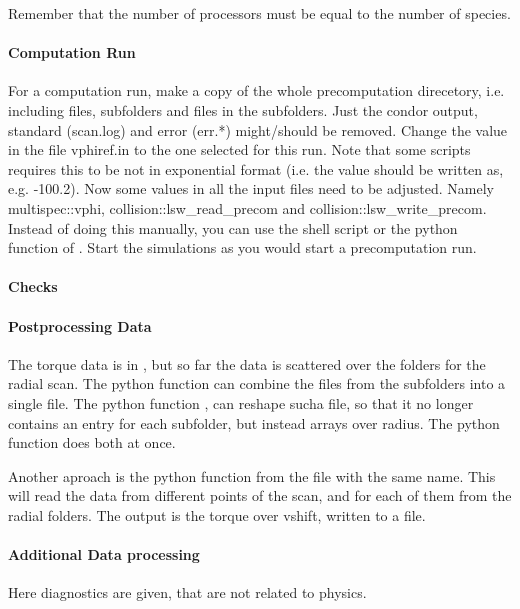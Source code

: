 Remember that the number of processors must be equal to the number of
species.

\paragraph{Computation Run}
For a computation run, make a copy of the whole precomputation
direcetory, i.e. including files, subfolders and files in the
subfolders. Just the condor output, standard (scan.log) and error
(err.*) might/should be removed. Change the value in the file vphiref.in
to the one selected for this run. Note that some scripts requires this
to be not in exponential format (i.e. the value should be written as,
e.g. -100.2). Now some values in all the input files need to be adjusted.
Namely multispec::vphi, collision::lsw\_read\_precom and
collision::lsw\_write\_precom.
Instead of doing this manually, you can use the shell script
 or the python function  of
.
Start the simulations as you would start a precomputation run.

\paragraph{Checks}

\paragraph{Postprocessing Data}
The torque data is in , but so far the
data is scattered over the folders for the radial scan. The python
function  can
combine the files from the subfolders into a single file. The python
function , can reshape sucha file, so that
it no longer contains an entry for each subfolder, but instead arrays
over radius. The python function  does
both at once.

Another aproach is the python function  from
the file with the same name. This will read the data from different
points of the scan, and for each of them from the radial folders. The
output is the torque over vshift, written to a file.

\paragraph{Additional Data processing}
Here diagnostics are given, that are not related to physics.

